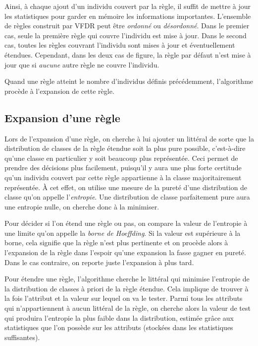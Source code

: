             Ainsi, à chaque ajout d’un individu couvert par la règle, il suffit de mettre à jour les statistiques pour garder en mémoire les informations importantes. L’ensemble de règles construit par VFDR peut être \emph{ordonné} ou \emph{désordonné}. Dans le premier cas, seule la première règle qui couvre l’individu est mise à jour. Dans le second cas, toutes les règles couvrant l’individu sont mises à jour et éventuellement étendues. Cependant, dans les deux cas de figure, la règle par défaut n’est mise à jour que si \emph{aucune} autre règle ne couvre l’individu.

            Quand une règle atteint le nombre d’individus définis précédemment, l’algorithme procède à l'expansion de cette règle.

        \subsection{Expansion d'une règle}

            Lors de l’expansion d’une règle, on cherche à lui ajouter un littéral de sorte que la distribution de classes de la règle étendue soit la plus pure possible, c’est-à-dire qu’une classe en particulier y soit beaucoup plus représentée. Ceci permet de prendre des décisions plus facilement, puisqu’il y aura une plus forte certitude qu’un individu couvert par cette règle appartienne à la classe majoritairement représentée. À cet effet, on utilise une mesure de la pureté d’une distribution de classe qu’on appelle l’\emph{entropie}. Une distribution de classe parfaitement pure aura une entropie nulle, on cherche donc à la minimiser.
            
            Pour décider si l'on étend une règle ou pas, on compare la valeur de l'entropie à une limite qu'on appelle la \emph{borne de Hoeffding}. Si la valeur est supérieure à la borne, cela signifie que la règle n'est plus pertinente et on procède alors à l'expansion de la règle dans l'espoir qu'une expansion la fasse gagner en pureté. Dans le cas contraire, on reporte juste l'expansion à plus tard.

            Pour étendre une règle, l’algorithme cherche le littéral qui minimise l’entropie de la distribution de classes à priori de la règle étendue. Cela implique de trouver à la fois l’attribut et la valeur sur lequel on va le tester. Parmi tous les attributs qui n’appartiennent à aucun littéral de la règle, on cherche alors la valeur de test qui produira l’entropie la plus faible dans la distribution, estimée grâce aux statistiques que l’on possède sur les attributs (stockées dans les statistiques suffisantes).

